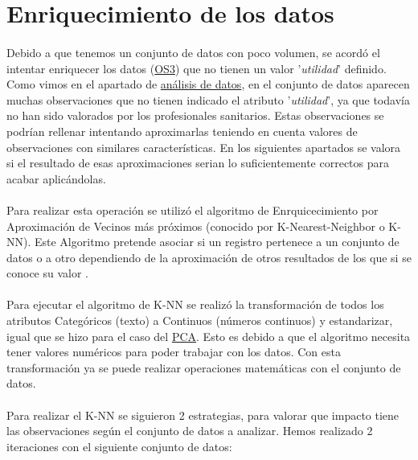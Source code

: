 \section{Enriquecimiento de los datos}
\label{section:knn}

\paragraph{}
Debido a que tenemos un conjunto de datos con poco volumen, se acordó el intentar enriquecer los datos (\hyperref[os:OS3]{OS3}) que no tienen un valor '\textit{utilidad}' definido. Como vimos en el apartado de \hyperref[section:analisis_datos_utilidad]{análisis de datos}, en el conjunto de datos aparecen muchas observaciones que no tienen indicado el atributo '\textit{utilidad}', ya que todavía no han sido valorados por los profesionales sanitarios. Estas observaciones se podrían rellenar intentando aproximarlas teniendo en cuenta valores de observaciones con similares características. En los siguientes apartados se valora si el resultado de esas aproximaciones serian lo suficientemente correctos para acabar aplicándolas.

\paragraph{}
Para realizar esta operación se utilizó el algoritmo de Enrquicecimiento por Aproximación de Vecinos más próximos (conocido por K-Nearest-Neighbor o K-NN). Este Algoritmo pretende asociar si un registro pertenece a un conjunto de datos o a otro dependiendo de la aproximación de otros resultados de los que si se conoce su valor \cite{ref:knn_def}.

\paragraph{}
Para ejecutar el algoritmo de K-NN se realizó la transformación de todos los
atributos Categóricos (texto) a Continuos (números continuos) y estandarizar, igual que se hizo para el caso del \hyperref[section:pca_standar]{PCA}. Esto es debido a que el algoritmo necesita tener valores numéricos para poder trabajar con los datos\cite{ref:knn_scaling}. Con esta transformación ya se puede realizar operaciones matemáticas con el conjunto de datos.

\paragraph{}
Para realizar el K-NN se siguieron 2 estrategias, para valorar que impacto tiene las observaciones según el conjunto de datos a analizar. Hemos realizado 2 iteraciones con el siguiente conjunto de datos:

